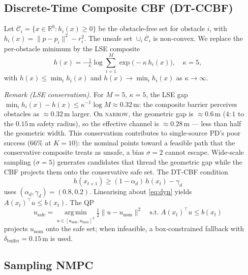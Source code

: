 \documentclass[11pt,onecolumn,a4paper]{article}
\newcommand{\R}{\mathbb{R}}
\newcommand{\nom}{\mathrm{nom}}
\newcommand{\safe}{\mathrm{safe}}
\begin{document}
\subsection{Discrete-Time Composite CBF (DT-CCBF)}

Let $\mathcal{C}_i = \{x \in \R^6 : h_i(x) \ge 0\}$ be the
obstacle-free set for obstacle $i$, with $h_i(x) = \|p - p_i\|^2 - r_i^2$.
The unsafe set $\cup_i \overline{\mathcal{C}}_i$ is non-convex. We
replace the per-obstacle minimum by the LSE composite
\begin{equation}\label{eq:lse}
h(x) = -\tfrac{1}{\kappa} \log \sum_{i=1}^{M}
\exp\!\big(-\kappa\, h_i(x)\big), \quad \kappa = 5,
\end{equation}
with $h(x) \le \min_i h_i(x)$ and $h(x) \to \min_i h_i(x)$ as
$\kappa \to \infty$.

\emph{Remark (LSE conservatism).}
For $M = 5$, $\kappa = 5$, the LSE gap $\min_i h_i(x) - h(x)
\le \kappa^{-1}\log M \approx 0.32\,$m: the composite barrier
perceives obstacles as ${\approx}0.32\,$m larger. On \textsc{narrow},
the geometric gap is ${\approx}0.6\,$m ($4{:}1$ to the $0.15\,$m
safety radius), so the effective channel is ${\approx}0.28\,$m
--- less than half the geometric width. This conservatism contributes
to single-source PD's poor success ($66\%$ at $K = 10$): the nominal
points toward a feasible path that the conservative composite treats
as unsafe, a bias $\sigma = 2$ cannot escape. Wide-scale sampling
($\sigma = 5$) generates candidates that thread the geometric gap
while the CBF projects them onto the conservative safe set. The
DT-CBF condition \cite{WAN17,AME17}
\begin{equation}\label{eq:dt-ccbf}
h(x_{t+1}) \ge (1 - \alpha_d)\, h(x_t) - \gamma_d
\end{equation}
uses $(\alpha_d, \gamma_d) = (0.8, 0.2)$. Linearising about
\eqref{eq:dyn} yields $A(x_t)^\top u \le b(x_t)$. The QP
\begin{equation}\label{eq:qp}
u_\safe = \operatorname*{arg\,min}_{u \in [u_{\min}, u_{\max}]^3}
\tfrac{1}{2} \|u - u_\nom\|^2
\quad \text{s.t.}\; A(x_t)^\top u \le b(x_t)
\end{equation}
projects $u_\nom$ onto the safe set; when infeasible, a box-constrained
fallback with $\delta_{\mathrm{buffer}} = 0.15\,$m is used.

\subsection{Sampling NMPC}
\end{document}
